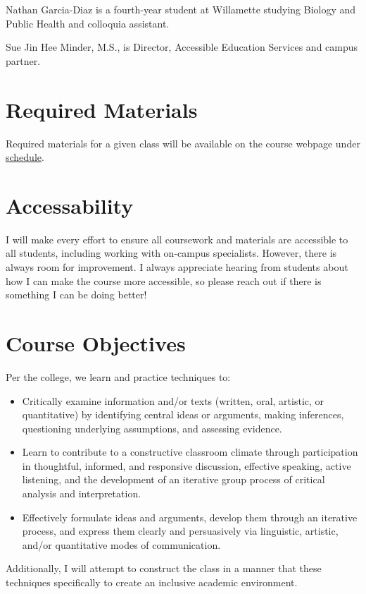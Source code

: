 \documentclass[11pt]{article}
\begin{document}
Nathan Garcia-Diaz is a fourth-year student at Willamette studying Biology and Public Health and colloquia assistant.

Sue Jin Hee Minder, M.S., is Director, Accessible Education Services and campus partner.


\section*{Required Materials}

Required materials for a given class will be available on the course webpage under \href{https://cd-public.github.io/courses/soc/sched.html}{schedule}.




\section*{Accessability}

I will make every effort to ensure all coursework and materials are accessible to all students, including working with on-campus specialists. However, there is always room for improvement. I always appreciate hearing from students about how I can make the course more accessible, so please reach out if there is something I can be doing better!


\section*{Course Objectives}
Per the college, we learn and practice techniques to:
\begin{itemize}
\item Critically examine information and/or texts (written, oral, artistic, or quantitative) by identifying central ideas or arguments, making inferences, questioning underlying assumptions, and assessing evidence.
\item Learn to contribute to a constructive classroom climate through participation in thoughtful, informed, and responsive discussion, effective speaking, active listening, and the development of an iterative group process of critical analysis and interpretation.
\item Effectively formulate ideas and arguments, develop them through an iterative process, and express them clearly and persuasively via linguistic, artistic, and/or quantitative modes of communication.
\end{itemize}
Additionally, I will attempt to construct the class in a manner that these techniques specifically to create an inclusive academic environment.
\end{document}

